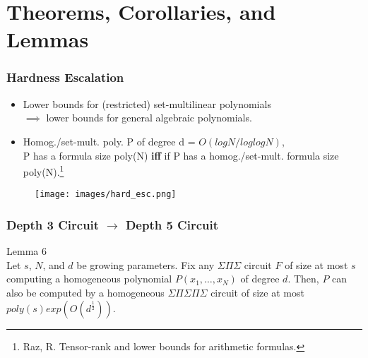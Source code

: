 \documentclass{beamer}
\begin{document}
\section{Theorems, Corollaries, and Lemmas}
\begin{frame}[allowframebreaks]
\frametitle{Hardness Escalation}
\begin{multicols}{2}[]
\begin{itemize}
\item Lower bounds for (restricted) set-multilinear polynomials  \\$\implies$ lower bounds for general algebraic polynomials.\\
\item Homog./set-mult. poly. P of degree d = $O(log N / log log N)$,\\ P has a formula size poly(N) \textbf{iff} if P has a homog./set-mult. formula size poly(N).\footnote{Raz, R. Tensor-rank and lower bounds for arithmetic formulas.}
\end{itemize}

\begin{figure}[H]
    \centering
    \texttt{[image: images/hard\_esc.png]}
\end{figure}
\end{multicols}
\end{frame}

\begin{frame}[allowframebreaks]
\frametitle{Depth 3 Circuit $\rightarrow$ Depth 5 Circuit}
\begin{exampleblock}{Lemma 6}\\
    Let $s$, $N$, and $d$ be growing parameters. Fix any $\Sigma\Pi\Sigma$ circuit $F$ of size at most $s$ computing a homogeneous polynomial $P(x_1, \dots, x_N)$ of degree $d$. Then, $P$ can also be computed by a homogeneous $\Sigma\Pi\Sigma\Pi\Sigma$ circuit of size at most $poly(s)exp(O(d^{\frac{1}{2}}))$.
\end{exampleblock}

\end{frame}
\end{document}
